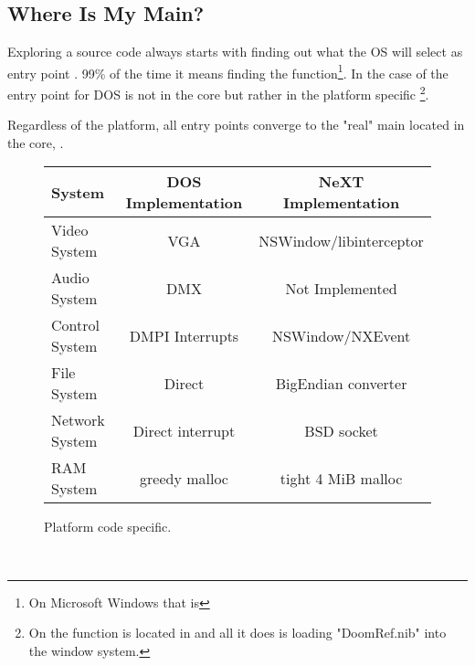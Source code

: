 \subsection{Where Is My Main?}
Exploring a source code always starts with finding out what the OS will select as entry point . 99\% of the time it means finding the  function\footnote{On Microsoft Windows that is }. In the case of \doom the entry point for DOS is not in the core but rather in the platform specific  \footnote{On \NeXT the  function is located in  and all it does is loading "DoomRef.nib" into the window system.}.\\
\par
Regardless of the platform, all entry points converge to the "real" main located in the core, .\\ 
\par

 \begin{figure}[H]
\centering  
\begin{tabularx}{\textwidth}{ L{0.22} | C{0.39} | C{0.39} }
  \toprule
  \textbf{System} & \textbf{DOS Implementation} & \textbf{NeXT Implementation}\\
  \toprule 
    Video System & VGA & NSWindow/libinterceptor\\
    Audio System & DMX & Not Implemented\\
    Control System & DMPI Interrupts & NSWindow/NXEvent \\
    File  System & Direct & BigEndian converter\\
    Network System & Direct interrupt & BSD socket \\
    RAM System & greedy malloc & tight 4 MiB malloc\\
   \toprule
\end{tabularx}
\caption{Platform code specific.}
\end{figure}

\par

\\


\par



